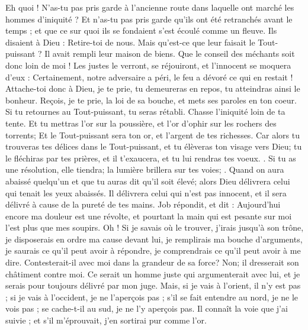 \begin{multicols}{2}
Eh quoi ! N'as-tu pas pris garde à l'ancienne route dans laquelle ont marché les hommes d'iniquité ?
Et n'as-tu pas pris garde qu'ils ont été retranchés avant le temps ; et que ce sur quoi ils se fondaient s'est écoulé comme un fleuve.
Ils disaient à Dieu : Retire-toi de nous. Mais qu'est-ce que leur faisait le Tout-puissant ?
Il avait rempli leur maison de biens. Que le conseil des méchants soit donc loin de moi !
Les justes le verront, se réjouiront, et l'innocent se moquera d'eux :
Certainement, notre adversaire a péri, le feu a dévoré ce qui en restait !
Attache-toi donc à Dieu, je te prie, tu demeureras en repos, tu atteindras ainsi le bonheur.
Reçois, je te prie, la loi de sa bouche, et mets ses paroles en ton coeur.
Si tu retournes au Tout-puissant, tu seras rétabli. Chasse l'iniquité loin de ta tente.
Et tu mettras l'or sur la poussière, et l'or d'ophir sur les rochers des torrents;
Et le Tout-puissant sera ton or, et l'argent de tes richesses.
Car alors tu trouveras tes délices dans le Tout-puissant, et tu élèveras ton visage vers Dieu; 
tu le fléchiras par tes prières, et il t'exaucera, et tu lui rendras tes voeux. .
Si tu as une résolution, elle tiendra; la lumière brillera sur tes voies; .
Quand on aura abaissé quelqu'un et que tu auras dit qu'il soit élevé; alors Dieu délivrera celui qui tenait les yeux abaissés.
Il délivrera celui qui n'est pas innocent, et il sera délivré à cause de la pureté de tes mains.
\VerseOne{}Job répondit, et dit :
Aujourd'hui encore ma douleur est une révolte, et pourtant la main qui est pesante sur moi l'est plus que mes soupirs.
Oh ! Si je savais où le trouver, j'irais jusqu'à son trône,
je disposerais en ordre ma cause devant lui, je remplirais ma bouche d'arguments,
je saurais ce qu'il peut avoir à répondre, je comprendrais ce qu'il peut avoir à me dire.
Contesterait-il avec moi dans la grandeur de sa force? Non; il dresserait  son châtiment contre moi. 
Ce serait un homme juste qui argumenterait avec lui, et je serais pour toujours délivré par mon juge.
Mais, si je vais à l'orient, il n'y est pas ; si je vais à l'occident, je ne l'aperçois pas ;
s'il se fait entendre au nord, je ne le vois pas ; se cache-t-il au sud, je ne l'y aperçois pas.
Il connaît la voie que j'ai suivie ; et s'il m'éprouvait, j'en sortirai pur comme l'or.

\end{multicols}
